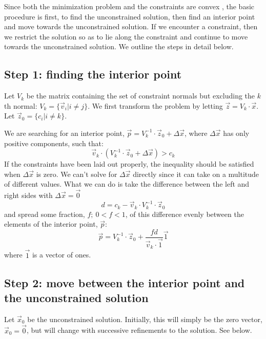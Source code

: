 \documentclass{article}
\begin{document}
Since both the minimization problem and the constraints are convex 
\citep{Boyd_etal2004}, the basic procedure is first, to find the unconstrained
solution, then find an interior point and move towards the unconstrained
solution. If we encounter a constraint, then we restrict the solution so as
to lie along the constraint and continue to move towards the unconstrained
solution. We outline the steps in detail below.

\subsection{Step 1: finding the interior point}

Let $V_k$ be the matrix containing the set of constraint normals but
excluding the $k$th normal: $V_k = \lbrace \vec v_i | i \ne j \rbrace$. 
We first transform the problem by letting $\vec z=V_k \cdot \vec x$.
Let $\vec z_0 = \lbrace c_i | i \ne k \rbrace$.

We are searching for an interior point, 
$\vec p = V_k^{-1} \cdot \vec z_0 + \Delta \vec x$, 
where $\Delta \vec x$ has only positive components, such that:
\begin{equation}
	\vec v_k \cdot \left ( V_k^{-1} \cdot \vec z_0 + \Delta \vec x \right ) > c_k
\end{equation}
If the constraints have been laid out properly, the inequality should be 
satisfied when $\Delta \vec x$ is zero.
We can't solve for $\Delta \vec x$ directly since it can take on a 
multitude of different values. What we can do is
take the difference between the left and right sides with $\Delta \vec x = \vec 0$
\begin{equation}
	d = c_k - \vec v_k \cdot V_k^{-1} \cdot \vec z_0
\end{equation}
and spread some fraction, $f;~0 < f < 1$, of this difference evenly between the 
elements of the interior point, $\vec p$:
\begin{equation}
	\vec p = V_k^{-1} \cdot \vec z_0 + \frac{f d}{\vec v_k \cdot \vec 1} \vec 1
\end{equation}
where $\vec 1$ is a vector of ones.

\subsection{Step 2: move between the interior point and the unconstrained solution}

Let $\vec x_0$ be the unconstrained solution. Initially, this will simply be
the zero vector, $\vec x_0 = \vec 0$, but will change with successive 
refinements to the solution. See below. 
\end{document}
